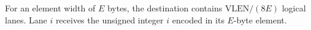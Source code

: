 For an element width of $E$ bytes, the destination contains
$\mathrm{VLEN}/(8E)$ logical lanes. Lane $i$ receives the unsigned integer $i$
encoded in its $E$-byte element.
